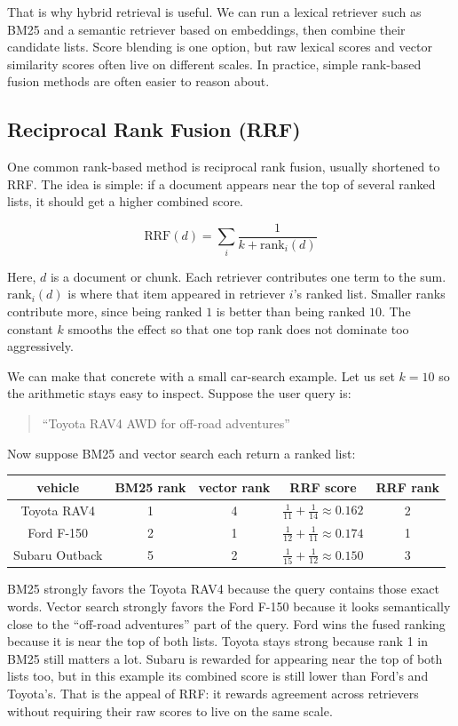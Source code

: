 \documentclass[12pt]{article}
\begin{document}
That is why hybrid retrieval is useful. We can run a lexical retriever
such as BM25 and a semantic retriever based on embeddings, then combine
their candidate lists. Score blending is one option, but raw lexical
scores and vector similarity scores often live on different scales. In
practice, simple rank-based fusion methods are often easier to reason
about.

\subsection{Reciprocal Rank Fusion (RRF)}

One common rank-based method is reciprocal rank fusion, usually shortened
to RRF. The idea is simple: if a document appears near the top of several
ranked lists, it should get a higher combined score.

\[
\mathrm{RRF}(d) = \sum_i \frac{1}{k + \mathrm{rank}_i(d)}
\]

Here, $d$ is a document or chunk. Each retriever contributes one term to
the sum. $\mathrm{rank}_i(d)$ is where that item appeared in retriever
$i$'s ranked list. Smaller ranks contribute more, since being ranked $1$
is better than being ranked $10$. The constant $k$ smooths the effect so
that one top rank does not dominate too aggressively.

We can make that concrete with a small car-search example. Let us set
$k = 10$ so the arithmetic stays easy to inspect. Suppose the user query
is:

\begin{quote}
``Toyota RAV4 AWD for off-road adventures''
\end{quote}

Now suppose BM25 and vector search each return a ranked list:

\begin{center}
\begin{tabular}{|c|c|c|c|c|}
\hline
vehicle & BM25 rank & vector rank & RRF score & RRF rank \\
\hline
Toyota RAV4 & 1 & 4 & $\frac{1}{11}+\frac{1}{14}\approx 0.162$ & 2 \\
Ford F-150 & 2 & 1 & $\frac{1}{12}+\frac{1}{11}\approx 0.174$ & 1 \\
Subaru Outback & 5 & 2 & $\frac{1}{15}+\frac{1}{12}\approx 0.150$ & 3 \\
\hline
\end{tabular}
\end{center}

BM25 strongly favors the Toyota RAV4 because the query contains those
exact words. Vector search strongly favors the Ford F-150 because it looks
semantically close to the ``off-road adventures'' part of the query.
Ford wins the fused ranking because it is near the top of both lists.
Toyota stays strong because rank 1 in BM25 still matters a lot. Subaru is
rewarded for appearing near the top of both lists too, but in this example
its combined score is still lower than Ford's and Toyota's. That is the
appeal of RRF: it rewards agreement across retrievers without requiring
their raw scores to live on the same scale.
\end{document}
